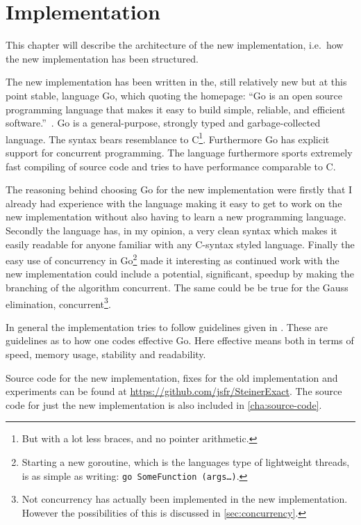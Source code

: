  {
\abnormalparskip{0pt}
\chapter{Implementation}
\label{cha:implementation}
}

This chapter will describe the architecture of the new implementation, i.e.\ how
the new implementation has been structured.

The new implementation has been written in the, still relatively new but at this
point stable, language Go, which quoting the homepage: ``Go is an open source
programming language that makes it easy to build simple, reliable, and efficient
software.''~\cite{golanghomepage}. Go is a general-purpose, strongly typed and
garbage-collected language. The syntax bears resemblance to C\footnote{But
  with a lot less braces, and no pointer arithmetic.}. Furthermore Go has
explicit support for concurrent programming. The language furthermore sports
extremely fast compiling of source code and tries to have performance
comparable to C.

The reasoning behind choosing Go for the new implementation were firstly that I
already had experience with the language making it easy to get to work on the
new implementation without also having to learn a new programming
language. Secondly the language has, in my opinion, a very clean syntax which
makes it easily readable for anyone familiar with any C-syntax styled
language. Finally the easy use of concurrency in Go\footnote{Starting a new
  goroutine, which is the languages type of lightweight threads, is as simple as
  writing: \texttt{go~SomeFunction~(args\ldots)}.} made it interesting as
continued work with the new implementation could include a potential,
significant, speedup by making the branching of the algorithm concurrent. The
same could be be true for the Gauss elimination, concurrent\footnote{Not
  concurrency has actually been implemented in the new implementation. However
  the possibilities of this is discussed in \cref{sec:concurrency}.}.

In general the implementation tries to follow guidelines given in
\textcite{effectivego}. These are guidelines as to how one codes effective
Go. Here effective means both in terms of speed, memory usage, stability and
readability.

Source code for the new implementation, fixes for the old implementation and
experiments can be found at \url{https://github.com/jsfr/SteinerExact}. The
source code for just the new implementation is also included in
\cref{cha:source-code}.

